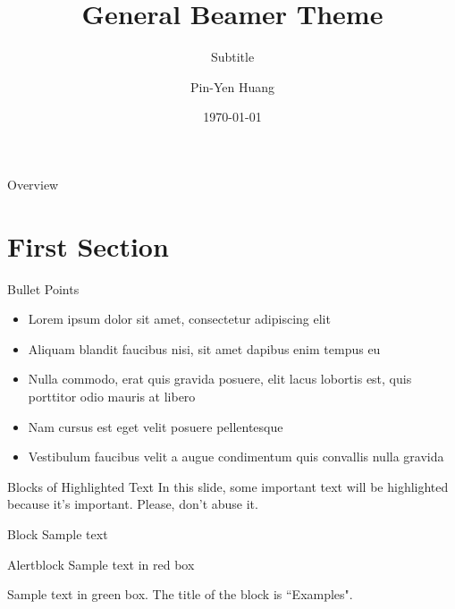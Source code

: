 \documentclass[aspectratio=169,xcolor=dvipsnames]{beamer}
\title[short title]{General Beamer Theme} %
\subtitle{Subtitle}
\author[Pin-Yen] {Pin-Yen Huang}
\institute[NTU] %
{
    Department of Computer Science and Information Engineering \\
    National Taiwan University %
    \vskip 3pt
}
\date{\today} %
\begin{document}
\begin{frame}
  \titlepage
\end{frame}

\begin{frame}{Overview}
  \tableofcontents
\end{frame}

\section{First Section}

\begin{frame}{Bullet Points}
  \begin{itemize}
    \item Lorem ipsum dolor sit amet, consectetur adipiscing elit
    \item Aliquam blandit faucibus nisi, sit amet dapibus enim tempus eu
    \item Nulla commodo, erat quis gravida posuere, elit lacus lobortis est, quis porttitor odio mauris at libero
    \item Nam cursus est eget velit posuere pellentesque
    \item Vestibulum faucibus velit a augue condimentum quis convallis nulla gravida
  \end{itemize}
\end{frame}


\begin{frame}{Blocks of Highlighted Text}
  In this slide, some important text will be \alert{highlighted} because it's important. Please, don't abuse it.

  \begin{block}{Block}
    Sample text
  \end{block}

  \begin{alertblock}{Alertblock}
    Sample text in red box
  \end{alertblock}

  \begin{examples}
    Sample text in green box. The title of the block is ``Examples".
  \end{examples}
\end{frame}
\end{document}
